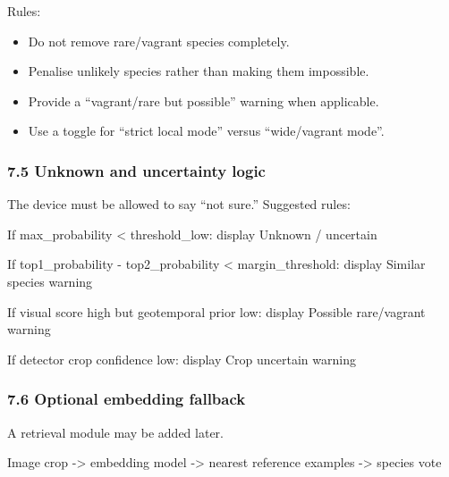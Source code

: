 \documentclass[
  11pt,
]{article}
\newenvironment{Shaded}{}{}
\newcommand{\NormalTok}[1]{#1}
\providecommand{\tightlist}{%
  \setlength{\itemsep}{0pt}\setlength{\parskip}{0pt}}
\begin{document}
Rules:

\begin{itemize}
\tightlist
\item
  Do not remove rare/vagrant species completely.
\item
  Penalise unlikely species rather than making them impossible.
\item
  Provide a ``vagrant/rare but possible'' warning when applicable.
\item
  Use a toggle for ``strict local mode'' versus ``wide/vagrant mode''.
\end{itemize}

\subsubsection{7.5 Unknown and uncertainty
logic}\label{unknown-and-uncertainty-logic}

The device must be allowed to say ``not sure.'' Suggested rules:

\begin{Shaded}
\begin{Highlighting}[]
\NormalTok{If max\_probability \textless{} threshold\_low:}
\NormalTok{  display Unknown / uncertain}

\NormalTok{If top1\_probability {-} top2\_probability \textless{} margin\_threshold:}
\NormalTok{  display Similar species warning}

\NormalTok{If visual score high but geotemporal prior low:}
\NormalTok{  display Possible rare/vagrant warning}

\NormalTok{If detector crop confidence low:}
\NormalTok{  display Crop uncertain warning}
\end{Highlighting}
\end{Shaded}

\subsubsection{7.6 Optional embedding
fallback}\label{optional-embedding-fallback}

A retrieval module may be added later.

\begin{Shaded}
\begin{Highlighting}[]
\NormalTok{Image crop {-}\textgreater{} embedding model {-}\textgreater{} nearest reference examples {-}\textgreater{} species vote}
\end{Highlighting}
\end{Shaded}
\end{document}
